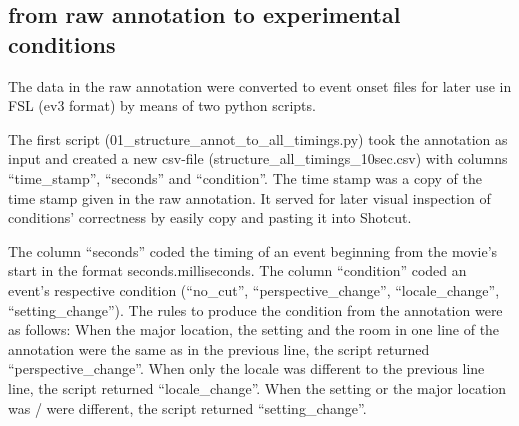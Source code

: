 \documentclass[10pt,a4paper,twocolumn]{article}
\begin{document}

\subsection*{from raw annotation to experimental conditions}


The data in the raw annotation were converted to event onset files
for later use in FSL (ev3 format) by means of two python scripts. 

The first script (01\_structure\_annot\_to\_all\_timings.py) took
the annotation as input and created a new csv-file (structure\_all\_timings\_10sec.csv)
with columns ``time\_stamp'', ``seconds'' and ``condition''.
The time stamp was a copy of the time stamp given in the raw annotation.
It served for later visual inspection of conditions' correctness by
easily copy and pasting it into Shotcut. 

The column ``seconds'' coded the timing of an event beginning from
the movie's start in the format seconds.milliseconds. The column ``condition''
coded an event's respective condition (``no\_cut'', ``perspective\_change'',
``locale\_change'', ``setting\_change''). The rules to produce
the condition from the annotation were as follows: When the major
location, the setting and the room in one line of the annotation were
the same as in the previous line, the script returned ``perspective\_change''.
When only the locale was different to the previous line line, the
script returned ``locale\_change''. When the setting or the major
location was / were different, the script returned ``setting\_change''. 
\end{document}
